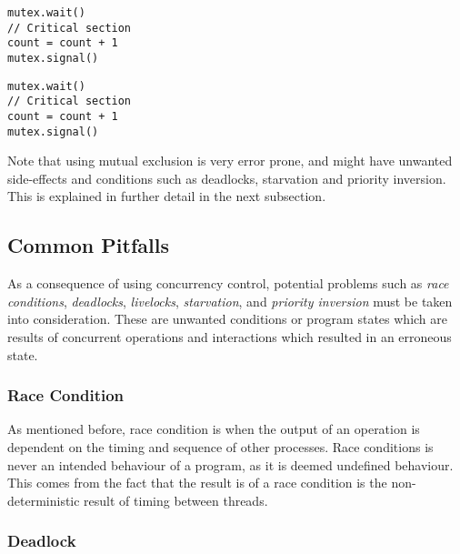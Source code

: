 \noindent\begin{minipage}{0.45\textwidth}
\begin{lstlisting}[title={Process A},style={CustomC},frame={},xleftmargin={4em}]
mutex.wait()
// Critical section
count = count + 1
mutex.signal()
\end{lstlisting}
\end{minipage}
\begin{minipage}{0.45\textwidth}
\begin{lstlisting}[title={Process B},style={CustomC},frame={},xleftmargin={4em}]
mutex.wait()
// Critical section
count = count + 1
mutex.signal()
\end{lstlisting}
\end{minipage}

Note that using mutual exclusion is very error prone, and might have unwanted side\hyp{}effects and conditions such as deadlocks, starvation and priority inversion. This is explained in further detail in the next subsection.


\subsection{Common Pitfalls}
\label{subsec:common_pitfals}

As a consequence of using concurrency control, potential problems such as \textit{race conditions}, \textit{deadlocks}, \textit{livelocks}, \textit{starvation}, and \textit{priority inversion} must be taken into consideration. These are unwanted conditions or program states which are results of concurrent operations and interactions which resulted in an erroneous state.


\subsubsection{Race Condition}

As mentioned before, race condition is when the output of an operation is dependent on the timing and sequence of other processes. Race conditions is never an intended behaviour of a program, as it is deemed undefined behaviour. This comes from the fact that the result is of a race condition is the non\hyp{}deterministic result of timing between threads. 


\subsubsection{Deadlock}

